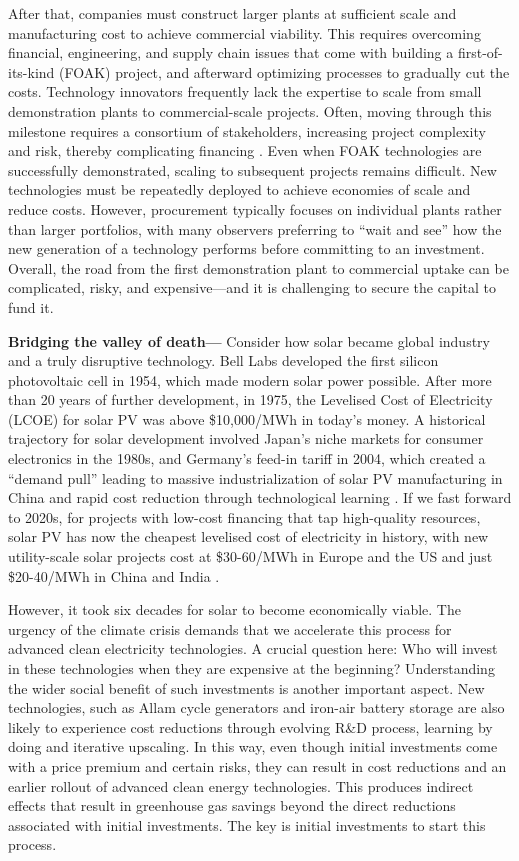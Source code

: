 \documentclass[pdflatex,sn-basic, Numbered]{sn-jnl}
\theoremstyle{thmstyleone}%
\theoremstyle{thmstyletwo}%
\theoremstyle{thmstylethree}%
\begin{document}
After that, companies must construct larger plants at sufficient scale and manufacturing cost to achieve commercial viability. This requires overcoming financial, engineering, and supply chain issues that come with building a first-of-its-kind (FOAK) project, and afterward optimizing processes to gradually cut the costs. Technology innovators frequently lack the expertise to scale from small demonstration plants to commercial-scale projects. Often, moving through this milestone requires a consortium of stakeholders, increasing project complexity and risk, thereby complicating financing \cite{google-advancedtech}.
Even when FOAK technologies are successfully demonstrated, scaling to subsequent projects remains difficult. New technologies must be repeatedly deployed to achieve economies of scale and reduce costs. However, procurement typically focuses on individual plants rather than larger portfolios, with many observers preferring to \enquote{wait and see} how the new generation of a technology performs before committing to an investment. Overall, the road from the first demonstration plant to commercial uptake can be complicated, risky, and expensive---and it is challenging to secure the capital to fund it.

\textbf{Bridging the valley of death---} Consider how solar became global industry and a truly disruptive technology. Bell Labs developed the first silicon photovoltaic cell in 1954, which made modern solar power possible. After more than 20 years of further development, in 1975, the Levelised Cost of Electricity (LCOE) for solar PV was above \$10,000/MWh in today's money. A historical trajectory for solar development involved Japan's niche markets for consumer electronics in the 1980s, and Germany's feed-in tariff in 2004, which created a \enquote{demand pull} leading to massive industrialization of solar PV manufacturing in China and rapid cost reduction through technological learning \cite{nemetHowSolarEnergy2019}. If we fast forward to 2020s, for projects with low-cost financing that tap high-quality resources, solar PV has now the cheapest levelised cost of electricity in history, with new utility-scale solar projects cost at \$30-60/MWh in Europe and the US and just \$20-40/MWh in China and India \cite{WorldEnergyOutlook2020}.

However, it took six decades for solar to become economically viable. The urgency of the climate crisis demands that we accelerate this process for advanced clean electricity technologies. A crucial question here: Who will invest in these technologies when they are expensive at the beginning? Understanding the wider social benefit of such investments is another important aspect.  New technologies, such as Allam cycle generators and iron-air battery storage are also likely to experience cost reductions through evolving R\&D process, learning by doing and iterative upscaling. In this way, even though initial investments come with a price premium and certain risks, they can result in cost reductions and an earlier rollout of advanced clean energy technologies. This produces indirect effects that result in greenhouse gas savings beyond the direct reductions associated with initial investments. The key is initial investments to start this process.
\end{document}
